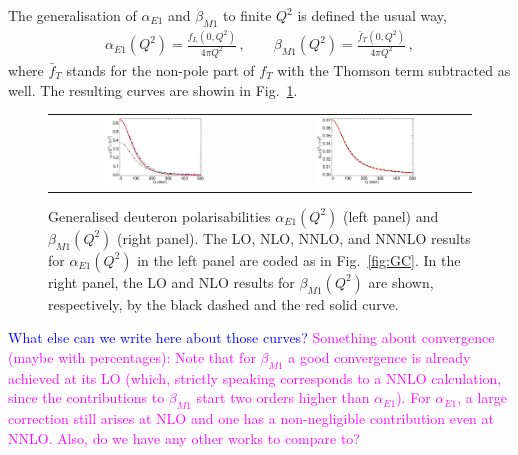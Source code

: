 \documentclass[prl,
twocolumn,
showpacs,preprintnumbers,amsmath,amssymb,
superscriptaddress,
a4paper,nofootinbib,longbibliography]{revtex4-2}
\begin{document}
The generalisation of $\alpha_{E1}$ and $\beta_{M1}$ to finite $Q^2$ is defined the usual way,
\begin{align}
    \alpha_{E1}(Q^2) = \frac{f_L(0,Q^2)}{4\pi Q^2}\,,\qquad 
    \beta_{M1}(Q^2)  = \frac{\bar{f}_T(0,Q^2)}{4\pi Q^2}\,,
\end{align}
where $\bar{f}_T$ stands for the non-pole part of $f_T$ with the Thomson term subtracted as well. The resulting curves are showin in Fig.~\ref{fig:alpha_beta}.
\begin{figure}[htb]
    \centering
    \begin{tabular}{cc}
    \includegraphics[width=0.5\textwidth]{figs/alphaE.pdf} &
    \includegraphics[width=0.5\textwidth]{figs/betaM.pdf}
    \end{tabular}
    \caption{Generalised deuteron polarisabilities $\alpha_{E1}(Q^2)$ (left panel) and $\beta_{M1}(Q^2)$ (right panel). The LO, NLO, NNLO, and NNNLO results for $\alpha_{E1}(Q^2)$ in the left panel are coded as in Fig.~\ref{fig:GC}. In the right panel, the LO and NLO results for $\beta_{M1}(Q^2)$ are shown, respectively, by the black dashed and the red solid curve.}
    \label{fig:alpha_beta}
\end{figure}
\textcolor{blue}{What else can we write here about those curves?} \textcolor{magenta}{Something about convergence (maybe with percentages): Note that for $\beta_{M1}$ a good convergence is already achieved at its LO (which, strictly speaking corresponds to a NNLO calculation, since the contributions to $\beta_{M1}$ start two orders higher than $\alpha_{E1}$). For $\alpha_{E1}$, a large correction still arises at NLO and one has a non-negligible contribution even at NNLO. Also, do we have any other works to compare to?}
\end{document}
